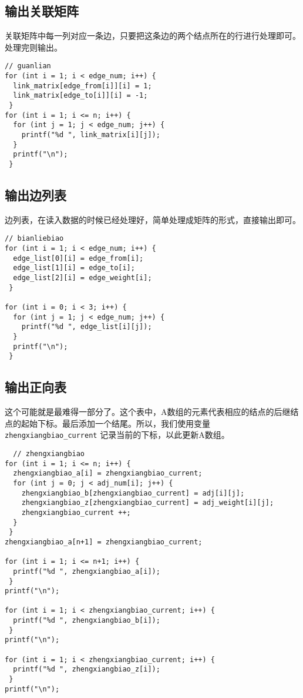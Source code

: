 \documentclass[11pt]{article}
\begin{document}
\subsection{输出关联矩阵}
\label{sec:org00c5648}
关联矩阵中每一列对应一条边，只要把这条边的两个结点所在的行进行处理即可。处理完则输出。

\begin{verbatim}
// guanlian
for (int i = 1; i < edge_num; i++) {
  link_matrix[edge_from[i]][i] = 1;
  link_matrix[edge_to[i]][i] = -1;
 }
for (int i = 1; i <= n; i++) {
  for (int j = 1; j < edge_num; j++) {
    printf("%d ", link_matrix[i][j]);
  }
  printf("\n");
 }
\end{verbatim}

\subsection{输出边列表}
\label{sec:orgba5faeb}
边列表，在读入数据的时候已经处理好，简单处理成矩阵的形式，直接输出即可。

\begin{verbatim}
// bianliebiao
for (int i = 1; i < edge_num; i++) {
  edge_list[0][i] = edge_from[i];
  edge_list[1][i] = edge_to[i];
  edge_list[2][i] = edge_weight[i];
 }

for (int i = 0; i < 3; i++) {
  for (int j = 1; j < edge_num; j++) {
    printf("%d ", edge_list[i][j]);
  }
  printf("\n");
 }
\end{verbatim}

\subsection{输出正向表}
\label{sec:orgc825de7}
这个可能就是最难得一部分了。这个表中，A数组的元素代表相应的结点的后继结点的起始下标。最后添加一个结尾。所以，我们使用变量 \texttt{zhengxiangbiao\_current} 记录当前的下标，以此更新A数组。

\begin{verbatim}
  // zhengxiangbiao
for (int i = 1; i <= n; i++) {
  zhengxiangbiao_a[i] = zhengxiangbiao_current;
  for (int j = 0; j < adj_num[i]; j++) {
    zhengxiangbiao_b[zhengxiangbiao_current] = adj[i][j];
    zhengxiangbiao_z[zhengxiangbiao_current] = adj_weight[i][j];
    zhengxiangbiao_current ++;
  }
 }
zhengxiangbiao_a[n+1] = zhengxiangbiao_current;

for (int i = 1; i <= n+1; i++) {
  printf("%d ", zhengxiangbiao_a[i]);
 }
printf("\n");

for (int i = 1; i < zhengxiangbiao_current; i++) {
  printf("%d ", zhengxiangbiao_b[i]);
 }
printf("\n");

for (int i = 1; i < zhengxiangbiao_current; i++) {
  printf("%d ", zhengxiangbiao_z[i]);
 }
printf("\n");
\end{verbatim}
\end{document}

